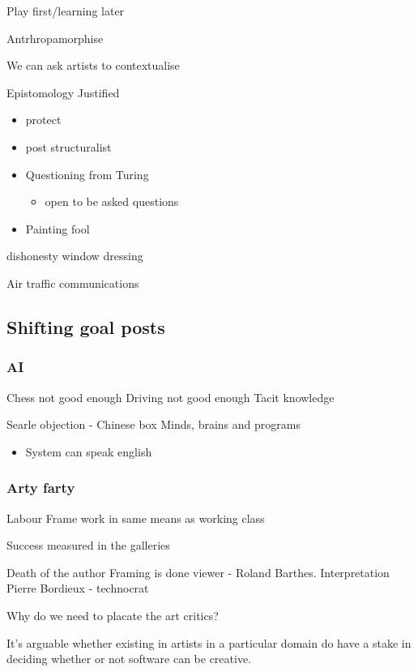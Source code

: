 \documentclass[11pt]{article}
\begin{document}
Play first/learning later

Antrhropamorphise

We can ask artists to contextualise

Epistomology
Justified 
\begin{itemize}
\item protect
\item post structuralist
\item Questioning from Turing
\begin{itemize}
\item open to be asked questions
\end{itemize}

\item Painting fool
\end{itemize}
dishonesty
window dressing

Air traffic communications

\subsection{Shifting goal posts}
\label{sec:orge1012ef}

\subsubsection{AI}
\label{sec:org31376c0}
Chess not good enough
Driving not good enough
Tacit knowledge

Searle objection - Chinese box
Minds, brains and programs
\begin{itemize}
\item System can speak english
\end{itemize}

\subsubsection{Arty farty}
\label{sec:orgd72c760}

Labour
Frame work in same means as working class

Success measured in the galleries

Death of the author
Framing is done viewer - Roland Barthes. Interpretation
Pierre Bordieux - technocrat

Why do we need to placate the art critics?

It's arguable whether existing in artists in a particular domain do have a stake in deciding whether or not software can be creative.
\end{document}
